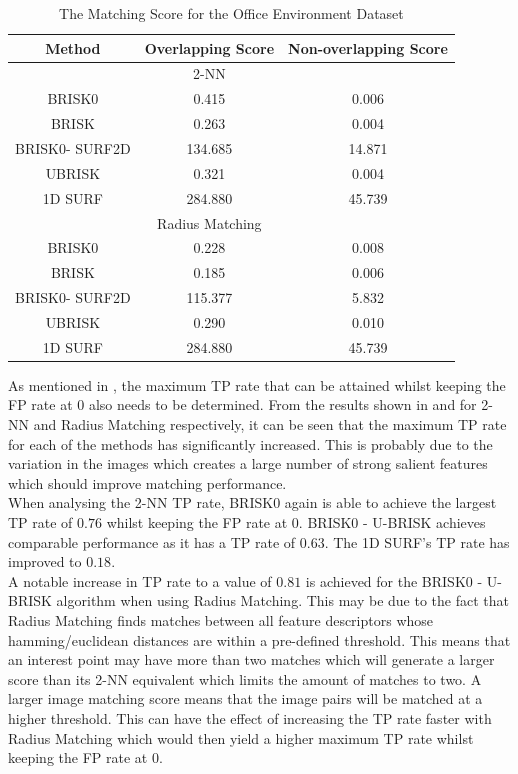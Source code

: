 \documentclass[11pt]{report}
\begin{document}
\begin{table}
\caption{The Matching Score for the Office Environment Dataset}
\begin{tabular}{|c|c|c|}
\hline 
Method & Overlapping Score & Non-overlapping Score\tabularnewline
\hline 
\hline 
 & 2-NN & \tabularnewline
\hline 
BRISK0 & 0.415 & 0.006\tabularnewline
\hline 
BRISK & 0.263 & 0.004\tabularnewline
\hline 
BRISK0- SURF2D & 134.685 & 14.871\tabularnewline
\hline 
UBRISK & 0.321 & 0.004\tabularnewline
\hline 
1D SURF & 284.880 & 45.739\tabularnewline
\hline 
 & Radius Matching & \tabularnewline
\hline 
BRISK0 & 0.228 & 0.008\tabularnewline
\hline 
BRISK & 0.185 & 0.006\tabularnewline
\hline 
BRISK0- SURF2D & 115.377 & 5.832\tabularnewline
\hline 
UBRISK & 0.290 & 0.010\tabularnewline
\hline 
1D SURF & 284.880 & 45.739\tabularnewline
\hline 
\end{tabular}
\label{tab:oeMS}
\end{table}



As mentioned in , the maximum TP rate that can be attained whilst keeping the FP rate at $0$ also needs to be determined. From the results shown in  and  for 2-NN and Radius Matching respectively, it can be seen that the maximum TP rate for each of the methods has significantly increased. This is probably due to the variation in the images which creates a large number of strong salient features which should improve matching performance.\\

When analysing the 2-NN TP rate, BRISK0 again is able to achieve the largest TP rate of $0.76$ whilst keeping the FP rate at $0$. BRISK0 - U-BRISK achieves comparable performance as it has a TP rate of $0.63$. The 1D SURF's TP rate has improved to $0.18$.\\

A notable increase in TP rate to a value of $0.81$ is achieved for the BRISK0 - U-BRISK algorithm when using Radius Matching. This may be due to the fact that Radius Matching finds matches between all feature descriptors whose hamming/euclidean distances are within a pre-defined threshold. This means that an interest point may have more than two matches which will generate a larger score than its 2-NN equivalent which limits the amount of matches to two. A larger image matching score means that the image pairs will be matched at a higher threshold. This can have the effect of increasing the TP rate faster with Radius Matching which would then yield a higher maximum TP rate whilst keeping the FP rate at $0$.\\
\end{document}

